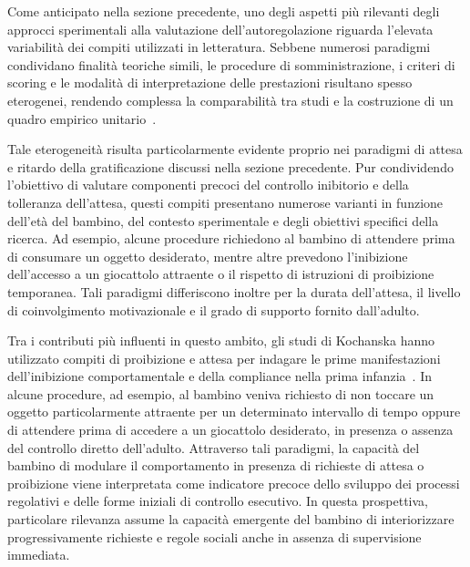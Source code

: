             Come anticipato nella sezione precedente, uno degli aspetti più rilevanti degli approcci sperimentali alla valutazione dell'autoregolazione riguarda l'elevata variabilità dei compiti utilizzati in letteratura. Sebbene numerosi paradigmi condividano finalità teoriche simili, le procedure di somministrazione, i criteri di scoring e le modalità di interpretazione delle prestazioni risultano spesso eterogenei, rendendo complessa la comparabilità tra studi e la costruzione di un quadro empirico unitario~\cite{hughes2002,mcclelland2012}.

            Tale eterogeneità risulta particolarmente evidente proprio nei paradigmi di attesa e ritardo della gratificazione discussi nella sezione precedente. Pur condividendo l'obiettivo di valutare componenti precoci del controllo inibitorio e della tolleranza dell'attesa, questi compiti presentano numerose varianti in funzione dell'età del bambino, del contesto sperimentale e degli obiettivi specifici della ricerca. Ad esempio, alcune procedure richiedono al bambino di attendere prima di consumare un oggetto desiderato, mentre altre prevedono l'inibizione dell'accesso a un giocattolo attraente o il rispetto di istruzioni di proibizione temporanea. Tali paradigmi differiscono inoltre per la durata dell'attesa, il livello di coinvolgimento motivazionale e il grado di supporto fornito dall'adulto.

            Tra i contributi più influenti in questo ambito, gli studi di Kochanska hanno utilizzato compiti di proibizione e attesa per indagare le prime manifestazioni dell'inibizione comportamentale e della compliance nella prima infanzia~\cite{kochanska2001}. In alcune procedure, ad esempio, al bambino veniva richiesto di non toccare un oggetto particolarmente attraente per un determinato intervallo di tempo oppure di attendere prima di accedere a un giocattolo desiderato, in presenza o assenza del controllo diretto dell'adulto. Attraverso tali paradigmi, la capacità del bambino di modulare il comportamento in presenza di richieste di attesa o proibizione viene interpretata come indicatore precoce dello sviluppo dei processi regolativi e delle forme iniziali di controllo esecutivo. In questa prospettiva, particolare rilevanza assume la capacità emergente del bambino di interiorizzare progressivamente richieste e regole sociali anche in assenza di supervisione immediata.

